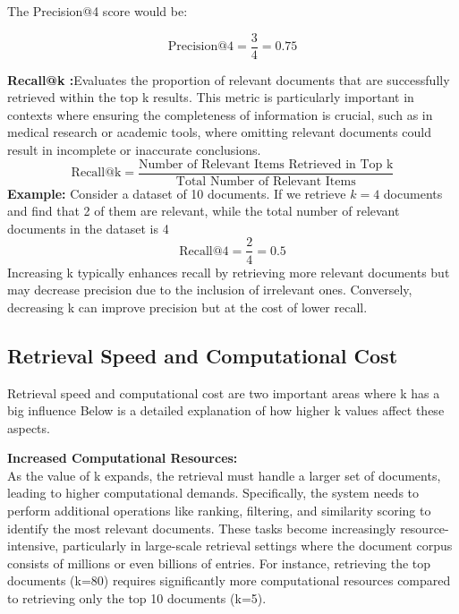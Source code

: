 The Precision@4 score would be:

\begin{equation}
\text{Precision@4} = \frac{3}{4} = 0.75
\end{equation}


\textbf{Recall@k :}Evaluates the proportion of relevant documents that are successfully retrieved within the top k results. This metric is particularly important in contexts where ensuring the completeness of information is crucial, such as in medical research or academic tools, where omitting relevant documents could result in incomplete or inaccurate conclusions\citep{deconvoluteai2024metrics}.
\begin{equation}
\text{Recall@k} = \frac{\text{Number of Relevant Items Retrieved in Top k}}{\text{Total Number of Relevant Items}}	
\end{equation}
\textbf{Example:}
Consider a dataset of 10 documents. If we retrieve \( k = 4 \) documents and find that 2 of them are relevant, while the total number of relevant documents in the dataset is 4
\begin{equation}
\text{Recall@4} = \frac{2}{4} = 0.5
\end{equation}
Increasing k typically enhances recall by retrieving more relevant documents but may decrease precision due to the inclusion of irrelevant ones. Conversely, decreasing k can improve precision but at the cost of lower recall. 
\subsection{Retrieval Speed and Computational Cost}
Retrieval speed and computational cost are two important areas where k has a big influence Below is a detailed explanation of how higher k values affect these aspects.

\textbf{Increased Computational Resources:} \\
As the value of k expands, the retrieval must handle a larger set of documents, leading to higher computational demands. Specifically, the system needs to perform additional operations like ranking, filtering, and similarity scoring to identify the most relevant documents. These tasks become increasingly resource-intensive, particularly in large-scale retrieval settings where the document corpus consists of millions or even billions of entries\citep{manning2008ir}. For instance, retrieving the top  documents (k=80) requires significantly more computational resources compared to retrieving only the top 10 documents (k=5). 

